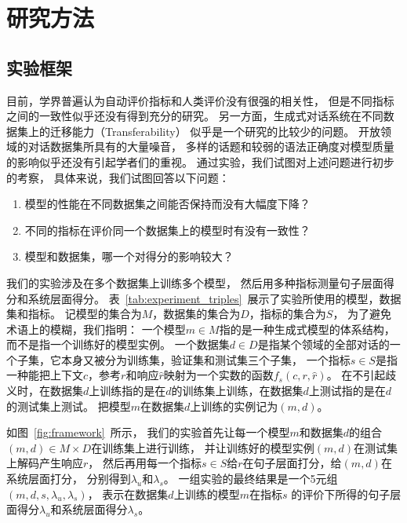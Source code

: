 \usepackage{graphicx}


\chapter{研究方法}\label{ch:method}

\section{实验框架}\label{sec:eval_framework}
目前，学界普遍认为自动评价指标和人类评价没有很强的相关性，
但是不同指标之间的一致性似乎还没有得到充分的研究。
另一方面，生成式对话系统在不同数据集上的迁移能力（Transferability）
似乎是一个研究的比较少的问题。
开放领域的对话数据集所具有的大量噪音，
多样的话题和较弱的语法正确度对模型质量的影响似乎还没有引起学者们的重视。
通过实验，我们试图对上述问题进行初步的考察，
具体来说，我们试图回答以下问题：
\begin{enumerate}
    \item 模型的性能在不同数据集之间能否保持而没有大幅度下降？
    \item 不同的指标在评价同一个数据集上的模型时有没有一致性？
    \item 模型和数据集，哪一个对得分的影响较大？
\end{enumerate}

我们的实验涉及在多个数据集上训练多个模型，
然后用多种指标测量句子层面得分和系统层面得分。
表~\ref{tab:experiment_triples}~展示了实验所使用的模型，数据集和指标。
记模型的集合为$M$，数据集的集合为$D$，指标的集合为$S$，
为了避免术语上的模糊，我们指明：
一个模型$m \in M$指的是一种生成式模型的体系结构，而不是指一个训练好的模型实例。
一个数据集$d \in D$是指某个领域的全部对话的一个子集，它本身又被分为训练集，验证集和测试集三个子集，
一个指标$s \in S$是指一种能把上下文$c$，参考$r$和响应$\hat{r}$映射为一个实数的函数$f_s(c, r, \hat{r})$。
在不引起歧义时，在数据集$d$上训练指的是在$d$的训练集上训练，在数据集$d$上测试指的是在$d$的测试集上测试。
把模型$m$在数据集$d$上训练的实例记为$(m, d)$。

如图~\ref{fig:framework}~所示，
我们的实验首先让每一个模型$m$和数据集$d$的组合
$(m, d) \in M \times D$在训练集上进行训练，
并让训练好的模型实例$(m, d)$在测试集上解码产生响应$r$，
然后再用每一个指标$s \in S$给$r$在句子层面打分，给$(m, d)$在系统层面打分，
分别得到$\lambda_{u}$和$\lambda_{s}$。
一组实验的最终结果是一个5元组$(m, d, s, \lambda_{u}, \lambda_{s})$，
表示在数据集$d$上训练的模型$m$在指标$s$
的评价下所得的句子层面得分$\lambda_u$和系统层面得分$\lambda_s$。

